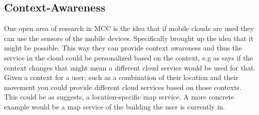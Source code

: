 \subsection{Context-Awareness}
One open area of research in MCC is the idea that if mobile clouds are used they can use the sensors of the mobile devices. 
Specifically \citet{5557960} brought up the idea that it might be possible.
This way they can provide context awareness and thus the service in the cloud could be personalized based on the context, e.g as \citet{fernando2013mobile} says if the context changes that might mean a different cloud service would be used for that. 
Given a context for a user, such as a combination of their location and their movement you could provide different cloud services based on those contexts. 
This could be as \citet{5557960} suggests, a location-specific map service. 
A more concrete example would be a map service of the building the user is currently in. 
\citep{sanaei2014heterogeneity}
